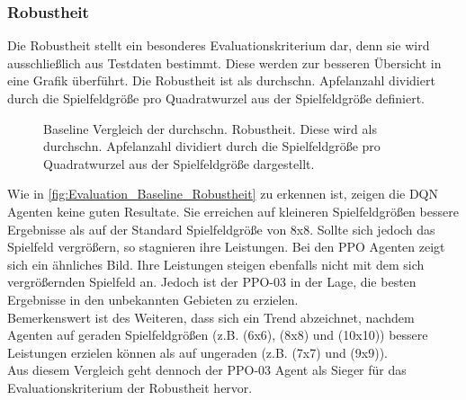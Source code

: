 \subsubsection{Robustheit}
Die Robustheit stellt ein besonderes Evaluationskriterium dar, denn sie wird ausschließlich aus Testdaten bestimmt. Diese werden zur besseren Übersicht in eine Grafik überführt. Die Robustheit ist als durchschn. Apfelanzahl dividiert durch die Spielfeldgröße pro Quadratwurzel aus der Spielfeldgröße definiert. 
\begin{figure}[H]
	\centering
	
	\caption[Baseline Vergleich Robustheit]{Baseline Vergleich der durchschn. Robustheit. Diese wird als durchschn. Apfelanzahl dividiert durch die Spielfeldgröße pro Quadratwurzel aus der Spielfeldgröße dargestellt.}
	\label{fig:Evaluation_Baseline_Robustheit}
\end{figure}
Wie in \autoref{fig:Evaluation_Baseline_Robustheit} zu erkennen ist, zeigen die DQN Agenten keine guten Resultate.
Sie erreichen auf kleineren Spielfeldgrößen bessere Ergebnisse als auf der Standard Spielfeldgröße von 8x8. Sollte sich jedoch das Spielfeld vergrößern, so stagnieren ihre Leistungen.
Bei den PPO Agenten zeigt sich ein ähnliches Bild. Ihre Leistungen steigen ebenfalls nicht mit dem sich vergrößernden Spielfeld an. Jedoch ist der PPO-03 in der Lage, die besten Ergebnisse in den unbekannten Gebieten zu erzielen.\\
Bemerkenswert ist des Weiteren, dass sich ein Trend abzeichnet, nachdem Agenten auf geraden Spielfeldgrößen (z.B. (6x6), (8x8) und (10x10)) bessere Leistungen erzielen können als auf ungeraden (z.B. (7x7) und (9x9)).\\
Aus diesem Vergleich geht dennoch der PPO-03 Agent als Sieger für das Evaluationskriterium der Robustheit hervor.

